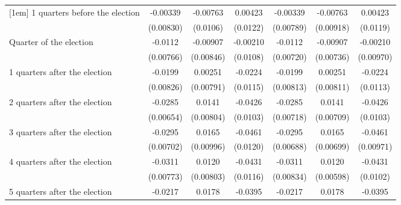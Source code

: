 \begin{table}[!ht]
\begin{tabular}{l*{6}{c}}
[1em]
 1 quarters before the election&    -0.00339         &    -0.00763         &     0.00423         &    -0.00339         &    -0.00763         &     0.00423         \\
                    &   (0.00830)         &    (0.0106)         &    (0.0122)         &   (0.00789)         &   (0.00918)         &    (0.0119)         \\
[1em]
Quarter of the election&     -0.0112         &    -0.00907         &    -0.00210         &     -0.0112         &    -0.00907         &    -0.00210         \\
                    &   (0.00766)         &   (0.00846)         &    (0.0108)         &   (0.00720)         &   (0.00736)         &   (0.00970)         \\
[1em]
 1 quarters after the election&     -0.0199\sym{*}  &     0.00251         &     -0.0224         &     -0.0199\sym{*}  &     0.00251         &     -0.0224\sym{*}  \\
                    &   (0.00826)         &   (0.00791)         &    (0.0115)         &   (0.00813)         &   (0.00811)         &    (0.0113)         \\
[1em]
 2 quarters after the election&     -0.0285\sym{***}&      0.0141         &     -0.0426\sym{***}&     -0.0285\sym{***}&      0.0141\sym{*}  &     -0.0426\sym{***}\\
                    &   (0.00654)         &   (0.00804)         &    (0.0103)         &   (0.00718)         &   (0.00709)         &    (0.0103)         \\
[1em]
 3 quarters after the election&     -0.0295\sym{***}&      0.0165         &     -0.0461\sym{***}&     -0.0295\sym{***}&      0.0165\sym{*}  &     -0.0461\sym{***}\\
                    &   (0.00702)         &   (0.00996)         &    (0.0120)         &   (0.00688)         &   (0.00699)         &   (0.00971)         \\
[1em]
 4 quarters after the election&     -0.0311\sym{***}&      0.0120         &     -0.0431\sym{***}&     -0.0311\sym{***}&      0.0120\sym{*}  &     -0.0431\sym{***}\\
                    &   (0.00773)         &   (0.00803)         &    (0.0116)         &   (0.00834)         &   (0.00598)         &    (0.0102)         \\
[1em]
 5 quarters after the election&     -0.0217\sym{**} &      0.0178         &     -0.0395\sym{***}&     -0.0217\sym{**} &      0.0178         &     -0.0395\sym{**} \\

\end{tabular}
\end{table}
